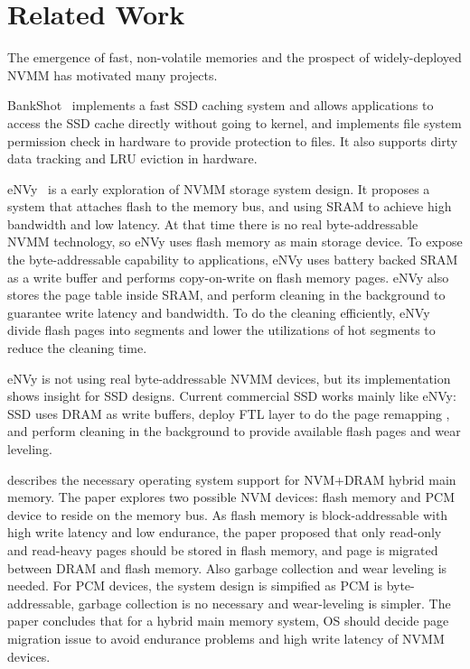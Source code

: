 \section{Related Work} 
\label{sec:related}

The emergence of fast, non-volatile memories and the prospect of
widely-deployed NVMM has motivated many projects.

BankShot~\cite{BankShot} implements a fast SSD caching system
and allows applications to access the SSD cache directly without going to
kernel, and implements file system permission check in hardware to provide
protection to files. It also supports dirty data tracking and LRU eviction
in hardware.

eNVy~\cite{eNVy} is a early exploration of NVMM storage system design.
It proposes a system that attaches flash to the memory
bus, and using SRAM to achieve high bandwidth and low latency. At that time
there is no real byte-addressable NVMM technology, so eNVy uses flash memory
as main storage device. To expose the byte-addressable capability to 
applications, eNVy uses battery backed SRAM as a write buffer and performs
copy-on-write on flash memory pages. eNVy also stores the page table inside
SRAM, and perform cleaning in the background to guarantee write latency and
bandwidth. To do the cleaning efficiently, eNVy divide flash pages into
segments and lower the utilizations of hot segments to reduce the cleaning
time.

eNVy is not using real byte-addressable NVMM devices, but its implementation
shows insight for SSD designs. Current commercial SSD works mainly like
eNVy: SSD uses DRAM as write buffers, deploy FTL layer to do the page remapping
, and perform cleaning in the background to provide available flash pages
and wear leveling.

\cite{Mogul} describes the necessary operating system support for
NVM+DRAM hybrid main memory. The paper explores two possible NVM devices:
flash memory and PCM device to reside on the memory bus. As flash memory
is block-addressable with high write latency and low endurance, the paper
proposed that only read-only and read-heavy pages should be stored in flash
memory, and page is migrated between DRAM and flash memory. Also garbage
collection and wear leveling is needed. For PCM devices, the system design
is simpified as PCM is byte-addressable, garbage collection is no necessary
and wear-leveling is simpler. The paper concludes that for a hybrid main
memory system, OS should decide page migration issue to avoid endurance
problems and high write latency of NVMM devices.

